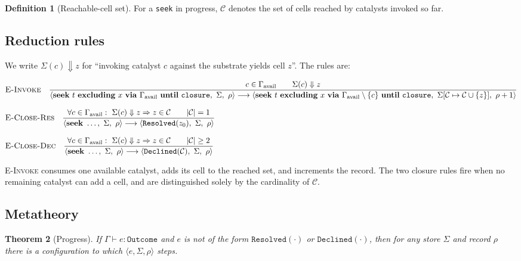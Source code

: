 \documentclass[11pt,a4paper]{article}
\theoremstyle{thmstyle}
\newtheorem{theorem}{Theorem}[section]
\theoremstyle{definition}
\newtheorem{definition}[theorem]{Definition}
\theoremstyle{remark}
\newcommand{\Env}{\Gamma}
\newcommand{\store}{\Sigma}
\newcommand{\steps}{\longrightarrow}
\newcommand{\abs}[1]{\lvert#1\rvert}
\newcommand{\seek}{\mathbf{seek}}
\newcommand{\excl}{\mathbf{excluding}}
\newcommand{\via}{\mathbf{via}}
\newcommand{\until}{\mathbf{until}}
\begin{document}
\begin{definition}[Reachable-cell set]
\label{def:reachable}
For a \texttt{seek} in progress, $\mathcal{C}$ denotes the set of cells
reached by catalysts invoked so far.
\end{definition}

\subsection{Reduction rules}

We write $\store(c)\Downarrow z$ for ``invoking catalyst $c$ against the
substrate yields cell $z$''. The rules are:

\begin{align*}
&\textsc{E-Invoke}\quad
\frac{c\in \Gamma_{\mathrm{avail}}\qquad \store(c)\Downarrow z}
{\langle \seek\ t\ \excl\ x\ \via\ \Gamma_{\mathrm{avail}}\ \until\ \texttt{closure},\ \store,\ \rho\rangle
\steps
\langle \seek\ t\ \excl\ x\ \via\ \Gamma_{\mathrm{avail}}\setminus\{c\}\ \until\ \texttt{closure},\ \store[\mathcal{C}\mapsto\mathcal{C}\cup\{z\}],\ \rho+1\rangle}\\[8pt]
&\textsc{E-Close-Res}\quad
\frac{\forall c\in\Gamma_{\mathrm{avail}}:\ \store(c)\Downarrow z\Rightarrow z\in\mathcal{C}
\qquad \abs{\mathcal{C}}=1}
{\langle \seek\ \dots,\ \store,\ \rho\rangle\steps
\langle \texttt{Resolved}(z_0),\ \store,\ \rho\rangle}\\[8pt]
&\textsc{E-Close-Dec}\quad
\frac{\forall c\in\Gamma_{\mathrm{avail}}:\ \store(c)\Downarrow z\Rightarrow z\in\mathcal{C}
\qquad \abs{\mathcal{C}}\ge2}
{\langle \seek\ \dots,\ \store,\ \rho\rangle\steps
\langle \texttt{Declined}(\mathcal{C}),\ \store,\ \rho\rangle}
\end{align*}

\textsc{E-Invoke} consumes one available catalyst, adds its cell to the
reached set, and increments the record. The two closure rules fire when no
remaining catalyst can add a cell, and are distinguished solely by the
cardinality of $\mathcal{C}$.

\subsection{Metatheory}

\begin{theorem}[Progress]
\label{thm:progress}
If $\Env\vdash e:\texttt{Outcome}$ and $e$ is not of the form
$\texttt{Resolved}(\cdot)$ or $\texttt{Declined}(\cdot)$, then for any store
$\store$ and record $\rho$ there is a configuration to which
$\langle e,\store,\rho\rangle$ steps.
\end{theorem}
\end{document}

